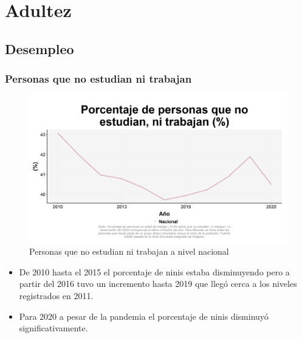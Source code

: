 \section{Adultez}
    \subsection{Desempleo}
        \subsubsection{Personas que no estudian ni trabajan}

    \begin{figure}[H]
        \caption{Personas que no estudian ni trabajan a nivel nacional \label{map_result_2} }
        \begin{center}
        \includegraphics[width=\textwidth,keepaspectratio]{img/var_36_trend.png}
        \end{center}
    \end{figure}
            \begin{itemize}
                \item De 2010 hasta el 2015 el porcentaje de ninis estaba disminuyendo pero a partir del 2016 tuvo un incremento hasta 2019 que llegó cerca a los niveles registrados en 2011.
                \item Para 2020 a pesar de la pandemia el porcentaje de ninis disminuyó significativamente.
                \end{itemize}

